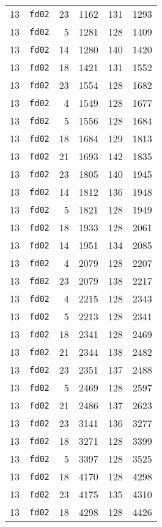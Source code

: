 \documentclass{article}
\begin{document}
\begin{table}[h!]
\begin{tabular}{llrrrl}
    13 & \texttt{fd02} & 23 & 1162 & 131 & 1293 \\
    13 & \texttt{fd02} & 5 & 1281 & 128 & 1409 \\
    13 & \texttt{fd02} & 14 & 1280 & 140 & 1420 \\
    13 & \texttt{fd02} & 18 & 1421 & 131 & 1552 \\
    13 & \texttt{fd02} & 23 & 1554 & 128 & 1682 \\
    13 & \texttt{fd02} & 4 & 1549 & 128 & 1677 \\
    13 & \texttt{fd02} & 5 & 1556 & 128 & 1684 \\
    13 & \texttt{fd02} & 18 & 1684 & 129 & 1813 \\
    13 & \texttt{fd02} & 21 & 1693 & 142 & 1835 \\
    13 & \texttt{fd02} & 23 & 1805 & 140 & 1945 \\
    13 & \texttt{fd02} & 14 & 1812 & 136 & 1948 \\
    13 & \texttt{fd02} & 5 & 1821 & 128 & 1949 \\
    13 & \texttt{fd02} & 18 & 1933 & 128 & 2061 \\
    13 & \texttt{fd02} & 14 & 1951 & 134 & 2085 \\
    13 & \texttt{fd02} & 4 & 2079 & 128 & 2207 \\
    13 & \texttt{fd02} & 23 & 2079 & 138 & 2217 \\
    13 & \texttt{fd02} & 4 & 2215 & 128 & 2343 \\
    13 & \texttt{fd02} & 5 & 2213 & 128 & 2341 \\
    13 & \texttt{fd02} & 18 & 2341 & 128 & 2469 \\
    13 & \texttt{fd02} & 21 & 2344 & 138 & 2482 \\
    13 & \texttt{fd02} & 23 & 2351 & 137 & 2488 \\
    13 & \texttt{fd02} & 5 & 2469 & 128 & 2597 \\
    13 & \texttt{fd02} & 21 & 2486 & 137 & 2623 \\
    13 & \texttt{fd02} & 23 & 3141 & 136 & 3277 \\
    13 & \texttt{fd02} & 18 & 3271 & 128 & 3399 \\
    13 & \texttt{fd02} & 5 & 3397 & 128 & 3525 \\
    13 & \texttt{fd02} & 18 & 4170 & 128 & 4298 \\
    13 & \texttt{fd02} & 23 & 4175 & 135 & 4310 \\
    13 & \texttt{fd02} & 18 & 4298 & 128 & 4426 \\

\end{tabular}
\end{table}
\end{document}
